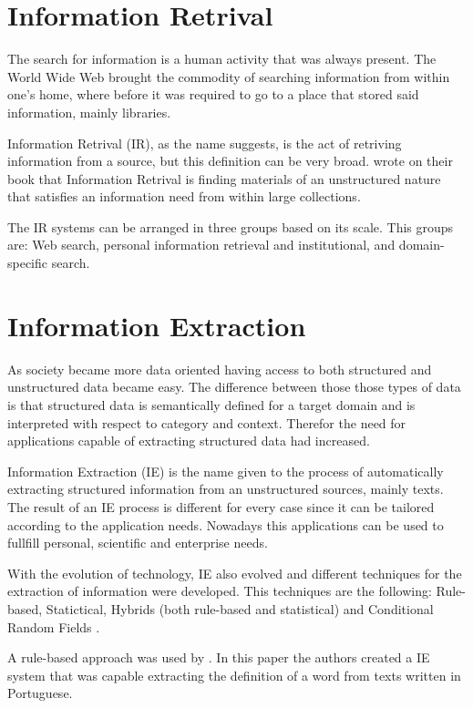 \section{Information Retrival}

The search for information is a human activity that was always present.
The World Wide Web brought the commodity of searching information from within one's home, where before it was required to go to a place that stored said information, mainly libraries.

Information Retrival (IR), as the name suggests, is the act of retriving information from a source, but this definition can be very broad.
\textcite{manning_2008} wrote on their book that Information Retrival is finding materials of an unstructured nature that satisfies an information need from within large collections.

The IR systems can be arranged in three groups based on its scale.
This groups are: Web search, personal information retrieval and institutional, and domain-specific search.

\section{Information Extraction}

As society became more data oriented having access to both structured and unstructured data became easy.
The difference between those those types of data is that structured data is semantically defined for a target domain and is interpreted with respect to category and context.
Therefor the need for applications capable of extracting structured data had increased.

Information Extraction (IE) is the name given to the process of automatically extracting structured information from an unstructured sources, mainly texts.
The result of an IE process is different for every case since it can be tailored according to the application needs.
Nowadays this applications can be used to fullfill personal, scientific and enterprise needs.

With the evolution of technology, IE also evolved and different techniques for the extraction of information were developed.
This techniques are the following: Rule-based, Statictical, Hybrids (both rule-based and statistical) and Conditional Random Fields \autocite{sarawagi_2008}.

A rule-based approach was used by \textcite{gaudio_2007}.
In this paper the authors created a IE system that was capable extracting the definition of a word from texts written in Portuguese.

